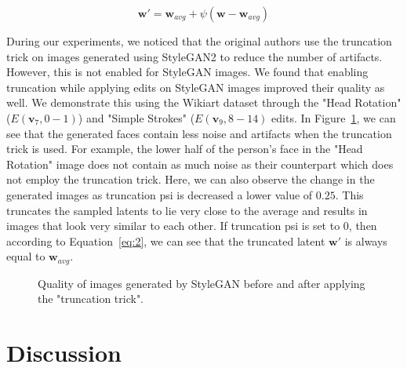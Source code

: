 \begin{equation}
    \mathbf{w'} = \mathbf{w}_{avg} + \psi (\mathbf{w} - \mathbf{w}_{avg})
    \label{eq:2}
\end{equation}

During our experiments, we noticed that the original authors use the truncation trick on images generated using StyleGAN2 to reduce the number of artifacts. However, this is not enabled for StyleGAN images. We found that enabling truncation while applying edits on StyleGAN images improved their quality as well. We demonstrate this using the Wikiart dataset through the "Head Rotation" ($E(\mathbf{v}_{7}, 0-1)$) and "Simple Strokes" ($E(\mathbf{v}_{9}, 8-14)$ edits. In Figure~\ref{fig:truncation_psi}, we can see that the generated faces contain less noise and artifacts when the truncation trick is used. For example, the lower half of the person's face in the "Head Rotation" image does not contain as much noise as their counterpart which does not employ the truncation trick. Here, we can also observe the change in the generated images as truncation psi is decreased a lower value of $0.25$. This truncates the sampled latents to lie very close to the average and results in images that look very similar to each other. If truncation psi is set to $0$, then according to Equation~\ref{eq:2}, we can see that the truncated latent $\mathbf{w}'$ is always equal to $\mathbf{w}_{avg}$.

\begin{figure}




\caption{Quality of images generated by StyleGAN before and after applying the "truncation trick".}
\label{fig:truncation_psi}
\end{figure}

\section{Discussion}

